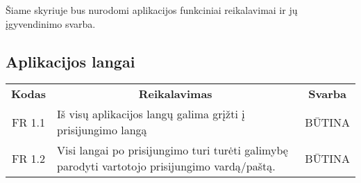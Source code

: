 \documentclass{VUMIFPSkursinis}
\begin{document}
Šiame skyriuje bus nurodomi aplikacijos funkciniai reikalavimai ir jų įgyvendinimo svarba.

\subsection{Aplikacijos langai}

\begin{center}
	\begin{table}[H]
	\begin{tabular}{|p{2cm}|p{}|p{}|}
	\hline
	    \rowcolor{lightgray}
		\multicolumn{3}{|c|}{Aplikacijos langai}\\
		
	\hline
		\multicolumn{1}{|c|}{{\bfseries Kodas}}&
		\multicolumn{1}{|c|}{{\bfseries Reikalavimas}}&
		\multicolumn{1}{|c|}{{\bfseries Svarba}}\\

	\hline
		\multicolumn{1}{|c|}{FR 1.1} &
		Iš visų aplikacijos langų galima grįžti į prisijungimo langą &
		\multicolumn{1}{|c|}{BŪTINA}\\
	\hline
		\multicolumn{1}{|c|}{FR 1.2} &
		{Visi langai po prisijungimo turi turėti galimybę parodyti vartotojo \newline prisijungimo vardą/paštą.}&
		\multicolumn{1}{|c|}{BŪTINA}\\
	\hline
	

\end{tabular}
\end{table}
\end{center}
\end{document}
